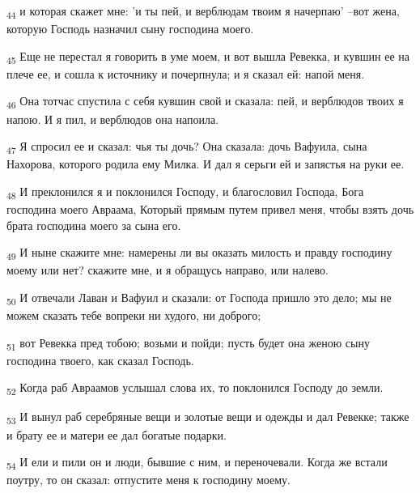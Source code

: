 \begin{tcolorbox}
\textsubscript{44} и которая скажет мне: 'и ты пей, и верблюдам твоим я начерпаю' --вот жена, которую Господь назначил сыну господина моего.
\end{tcolorbox}
\begin{tcolorbox}
\textsubscript{45} Еще не перестал я говорить в уме моем, и вот вышла Ревекка, и кувшин ее на плече ее, и сошла к источнику и почерпнула; и я сказал ей: напой меня.
\end{tcolorbox}
\begin{tcolorbox}
\textsubscript{46} Она тотчас спустила с себя кувшин свой и сказала: пей, и верблюдов твоих я напою. И я пил, и верблюдов она напоила.
\end{tcolorbox}
\begin{tcolorbox}
\textsubscript{47} Я спросил ее и сказал: чья ты дочь? Она сказала: дочь Вафуила, сына Нахорова, которого родила ему Милка. И дал я серьги ей и запястья на руки ее.
\end{tcolorbox}
\begin{tcolorbox}
\textsubscript{48} И преклонился я и поклонился Господу, и благословил Господа, Бога господина моего Авраама, Который прямым путем привел меня, чтобы взять дочь брата господина моего за сына его.
\end{tcolorbox}
\begin{tcolorbox}
\textsubscript{49} И ныне скажите мне: намерены ли вы оказать милость и правду господину моему или нет? скажите мне, и я обращусь направо, или налево.
\end{tcolorbox}
\begin{tcolorbox}
\textsubscript{50} И отвечали Лаван и Вафуил и сказали: от Господа пришло это дело; мы не можем сказать тебе вопреки ни худого, ни доброго;
\end{tcolorbox}
\begin{tcolorbox}
\textsubscript{51} вот Ревекка пред тобою; возьми и пойди; пусть будет она женою сыну господина твоего, как сказал Господь.
\end{tcolorbox}
\begin{tcolorbox}
\textsubscript{52} Когда раб Авраамов услышал слова их, то поклонился Господу до земли.
\end{tcolorbox}
\begin{tcolorbox}
\textsubscript{53} И вынул раб серебряные вещи и золотые вещи и одежды и дал Ревекке; также и брату ее и матери ее дал богатые подарки.
\end{tcolorbox}
\begin{tcolorbox}
\textsubscript{54} И ели и пили он и люди, бывшие с ним, и переночевали. Когда же встали поутру, то он сказал: отпустите меня к господину моему.
\end{tcolorbox}
